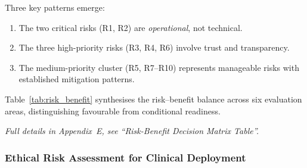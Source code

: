 \noindent Three key patterns emerge:
\begin{enumerate}[leftmargin=*, itemsep=1pt, label=(\arabic*)]
    \item The two critical risks (R1, R2) are \textit{operational}, not technical.
    \item The three high-priority risks (R3, R4, R6) involve trust and transparency.
    \item The medium-priority cluster (R5, R7--R10) represents manageable risks with established mitigation patterns.
\end{enumerate}

\noindent Table~\ref{tab:risk_benefit} synthesises the risk--benefit balance across six evaluation areas, distinguishing favourable from conditional readiness.

\noindent\textit{Full details in Appendix~E, see ``Risk-Benefit Decision Matrix Table''.}


\subsubsection{Ethical Risk Assessment for Clinical Deployment}

